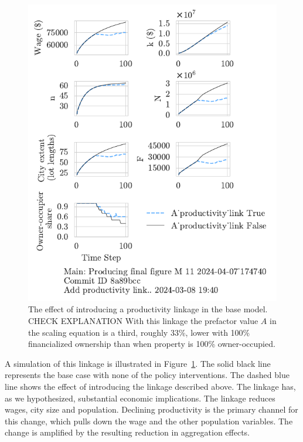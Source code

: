 \begin{figure}[h!tb] 
    \centering
    \includegraphics[scale=1, trim={0 1.4cm .8cm 0},clip]{fig/productivity_link_174740.pdf} 
    \caption[The effect of introducing a productivity linkage in the base model]{The effect of introducing a productivity linkage in the base model. {\color{red} CHECK EXPLANATION} With this linkage the prefactor value $A$ in the scaling equation is a third, roughly 33\%, lower with 100\% financialized ownership than when property is 100\% owner-occupied.}
    \label{fig-impact-channel-example}
\end{figure}

A simulation of this linkage is illustrated in Figure~\ref{fig-impact-channel-example}. The solid black line represents the base case with none of the policy interventions. The dashed blue line shows the effect of introducing the linkage described above. 
The linkage has, as we hypothesized, substantial economic implications. The linkage reduces wages, city size and population.  Declining productivity is the primary channel for this change, which pulls down the wage and the other population variables. The change is amplified by the resulting reduction in aggregation effects. 

